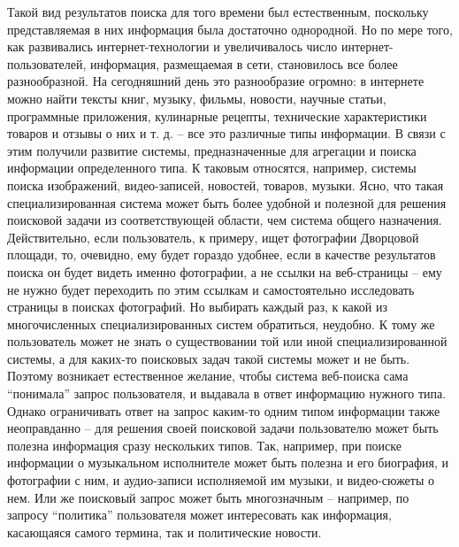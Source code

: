 \documentclass[12pt,a4paper]{report}
\newcommand\note[1]{\textcolor{red}{(#1)}}
\begin{document}
Такой вид результатов поиска для того времени был естественным, поскольку представляемая в них информация была достаточно однородной. 
Но по мере того, как развивались интернет-технологии и увеличивалось число интернет-пользователей, информация, размещаемая в сети, становилось все более разнообразной. На сегодняшний день это разнообразие огромно: в интернете можно найти тексты книг, музыку, фильмы, новости, научные статьи, программные приложения, кулинарные рецепты, технические характеристики товаров и отзывы о них и т. д. -- все это различные типы информации. В связи с этим получили развитие системы, предназначенные для агрегации и поиска информации определенного типа. К таковым относятся, например, системы поиска изображений, видео-записей, новостей, товаров, музыки. Ясно, что такая специализированная система может быть более удобной и полезной для решения поисковой задачи из соответствующей области, чем система общего назначения. 
Действительно, если пользователь, к примеру, ищет фотографии Дворцовой площади, то, очевидно, ему будет гораздо удобнее, если в качестве результатов поиска он будет видеть именно фотографии, а не ссылки на веб-страницы -- ему не нужно будет переходить по этим ссылкам и самостоятельно исследовать страницы в поисках фотографий.
Но выбирать каждый раз, к какой из многочисленных специализированных систем обратиться, неудобно. К тому же пользователь может не знать о существовании той или иной специализированной системы, а для каких-то поисковых задач такой системы может и не быть. Поэтому возникает естественное желание, чтобы система веб-поиска сама ``понимала'' запрос пользователя, и выдавала в ответ информацию нужного типа. Однако ограничивать ответ на запрос каким-то одним типом информации также неоправданно -- для решения своей поисковой задачи пользователю может быть полезна информация сразу нескольких типов. Так, например, при поиске информации о музыкальном исполнителе может быть полезна и его биография, и фотографии с ним, и аудио-записи исполняемой им музыки, и видео-сюжеты о нем. Или же поисковый запрос может быть многозначным -- например, по запросу ``политика'' пользователя может интересовать как информация, касающаяся самого термина, так и политические новости. 
\end{document}
